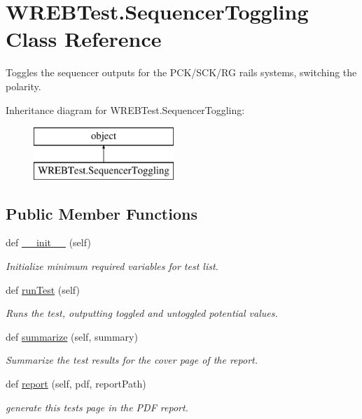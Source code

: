 \hypertarget{class_w_r_e_b_test_1_1_sequencer_toggling}{}\section{W\+R\+E\+B\+Test.\+Sequencer\+Toggling Class Reference}
\label{class_w_r_e_b_test_1_1_sequencer_toggling}


Toggles the sequencer outputs for the P\+C\+K/\+S\+C\+K/\+RG rails systems, switching the polarity.  


Inheritance diagram for W\+R\+E\+B\+Test.\+Sequencer\+Toggling\+:\begin{figure}[H]
\begin{center}
\leavevmode
\includegraphics[height=2.000000cm]{class_w_r_e_b_test_1_1_sequencer_toggling}
\end{center}
\end{figure}
\subsection*{Public Member Functions}
\begin{DoxyCompactItemize}
\item 
def \hyperlink{class_w_r_e_b_test_1_1_sequencer_toggling_a153dc6c61b777d29f1d0c40df1f6b783}{\+\_\+\+\_\+init\+\_\+\+\_\+} (self)
\begin{DoxyCompactList}\small\item\em Initialize minimum required variables for test list. \end{DoxyCompactList}\item 
def \hyperlink{class_w_r_e_b_test_1_1_sequencer_toggling_ae7cb075c9994b500d63b8bce2d9babd1}{run\+Test} (self)
\begin{DoxyCompactList}\small\item\em Runs the test, outputting toggled and untoggled potential values. \end{DoxyCompactList}\item 
def \hyperlink{class_w_r_e_b_test_1_1_sequencer_toggling_ad368de8f2a2aab9604a927e6016de323}{summarize} (self, summary)
\begin{DoxyCompactList}\small\item\em Summarize the test results for the cover page of the report. \end{DoxyCompactList}\item 
def \hyperlink{class_w_r_e_b_test_1_1_sequencer_toggling_af0bcf2c5cf3018fd2ba01e3b4a002d4e}{report} (self, pdf, report\+Path)
\begin{DoxyCompactList}\small\item\em generate this test\textquotesingle{}s page in the P\+DF report. \end{DoxyCompactList}\end{DoxyCompactItemize}


